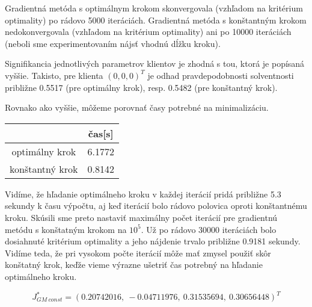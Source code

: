\documentclass[report.tex]{subfiles}
\begin{document}
Gradientná metóda s optimálnym krokom skonvergovala (vzhľadom na kritérium optimality) po rádovo 5000 iteráciách. Gradientná metóda s konštantným krokom nedokonvergovala (vzhľadom na kritérium optimality) ani po 10000 iteráciách (neboli sme experimentovaním nájsť vhodnú dĺžku kroku). 

Signifikancia jednotlivých parametrov klientov je zhodná s tou, ktorá je popísaná vyššie. Takisto, pre klienta $(0,0,0)^T$ je odhad pravdepodobnosti solventnosti približne 0.5517 (pre optimálny krok), resp. 0.5482 (pre konštantný krok).

Rovnako ako vyššie, môžeme porovnať časy potrebné na minimalizáciu.

\begin{center}
	\small
	\begin{tabular}{| c | c |}
		\hline
		& čas[s]  \\
		\hline
		optimálny krok & 6.1772  \\
		konštantný krok & 0.8142  \\
		\hline
	\end{tabular}
\end{center}

Vidíme, že hľadanie optimálneho kroku v každej iterácií pridá približne 5.3 sekundy k času výpočtu, aj keď iterácií bolo rádovo polovica oproti konštantnému kroku. Skúsili sme preto nastaviť maximálny počet iterácií pre gradientnú metódu s konštatným krokom na $10^5$. Už po rádovo 30000 iteráciách bolo dosiahnuté kritérium optimality a jeho nájdenie trvalo približne 0.9181 sekundy. Vidíme teda, že pri vysokom počte iterácií môže mať zmysel použiť skôr konštatný krok, keďže vieme výrazne ušetriť čas potrebný na hľadanie optimálneho kroku. 

\begin{equation*}
	J^*_{GM~const} = (0.20742016,~-0.04711976,~0.31535694,~0.30656448)^T
\end{equation*}
\end{document}
